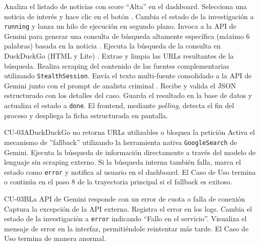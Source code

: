 \begin{UCtrayectoria}
	\UCpaso[\UCActor] Analiza el listado de noticias con score ``Alta'' en el dashboard.
	\UCpaso[\UCActor] Selecciona una noticia de interés y hace clic en el botón .
	\UCpaso[\UCsist] Cambia el estado de la investigación a \texttt{running} y lanza un hilo de ejecución en segundo plano.
	\UCpaso[\UCsist] Invoca a la API de Gemini para generar una consulta de búsqueda altamente específica (máximo 6 palabras) basada en la noticia .
	\UCpaso[\UCsist] Ejecuta la búsqueda de la consulta en DuckDuckGo (HTML y Lite) .
	\UCpaso[\UCsist] Extrae y limpia las URLs resultantes de la búsqueda.
	\UCpaso[\UCsist] Realiza scraping del contenido de las fuentes complementarias utilizando \texttt{StealthSession}.
	\UCpaso[\UCsist] Envía el texto multi-fuente consolidado a la API de Gemini junto con el prompt de analista criminal .
	\UCpaso[\UCsist] Recibe y valida el JSON estructurado con los detalles del caso.
	\UCpaso[\UCsist] Guarda el resultado en la base de datos y actualiza el estado a \texttt{done}.
	\UCpaso[\UCActor] El frontend, mediante \textit{polling}, detecta el fin del proceso y despliega la ficha estructurada en pantalla.
\end{UCtrayectoria}

\begin{UCtrayectoriaA}{CU-03}{A}{DuckDuckGo no retorna URLs utilizables o bloquea la petición}
	\UCpaso[\UCsist] Activa el mecanismo de ''fallback'' utilizando la herramienta nativa \texttt{GoogleSearch} de Gemini.
	\UCpaso[\UCsist] Ejecuta la búsqueda de información directamente a través del modelo de lenguaje sin scraping externo.
	\UCpaso[\UCsist] Si la búsqueda interna también falla, marca el estado como \texttt{error} y notifica al usuario en el dashboard.
	\UCpaso[] El Caso de Uso termina o continúa en el paso 8 de la trayectoria principal si el fallback es exitoso.
\end{UCtrayectoriaA}

\begin{UCtrayectoriaA}{CU-03}{B}{La API de Gemini responde con un error de cuota o falla de conexión}
	\UCpaso[\UCsist] Captura la excepción de la API externa.
	\UCpaso[\UCsist] Registra el error en los logs.
	\UCpaso[\UCsist] Cambia el estado de la investigación a \texttt{error} indicando ``Fallo en el servicio''.
	\UCpaso[\UCActor] Visualiza el mensaje de error en la interfaz, permitiéndole reintentar más tarde.
	\UCpaso[] El Caso de Uso termina de manera anormal.
\end{UCtrayectoriaA}
